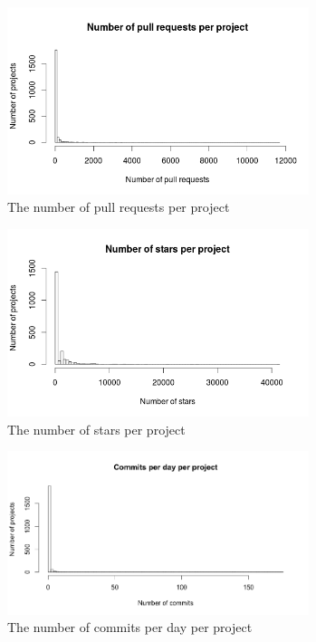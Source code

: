 	    \begin{figure}
	        \includegraphics[width=250pt]{figures/number-of-pull-requests-per-project}
	        \caption{The number of pull requests per project}
	        \label{fig:nr-pull-requests-plot}
	    \end{figure}

	    \begin{figure}
	        \includegraphics[width=250pt]{figures/number-of-stars-per-project}
	        \caption{The number of stars per project}
	        \label{fig:nr-stars-plot}
	    \end{figure}

	    \begin{figure}
	        \includegraphics[width=250pt]{figures/commits-per-day-per-project}
	        \caption{The number of commits per day per project}
	        \label{fig:nr-commits-day-plot}
	    \end{figure}


